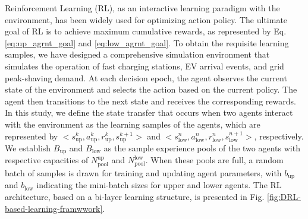 \documentclass[preprint,12pt]{elsarticle}
\begin{document}
Reinforcement Learning (RL), as an interactive learning paradigm with the environment, has been widely used for optimizing action policy. The ultimate goal of RL is to achieve maximum cumulative rewards, as represented by Eq. \ref{eq:up_agrnt_goal} and \ref{eq:low_agrnt_goal}. To obtain the requisite learning samples, we have designed a comprehensive simulation environment that simulates the operation of fast charging stations, EV arrival events, and grid peak-shaving demand. At each decision epoch, the agent observes the current state of the environment and selects the action based on the current policy. The agent then transitions to the next state and receives the corresponding rewards. In this study, we define the state transfer that occurs when two agents interact with the environment as the learning samples of the agents,
which are represented by $<s_{\textrm{up}}^{k},a_{\textrm{up}}^{k},r_{\textrm{up}}^{k},s_{\textrm{up}}^{k+1}>$ and $<s_{\textrm{low}}^{n},a_{\textrm{low}}^{n},r_{\textrm{low}}^{n},s_{\textrm{low}}^{n+1}>$,
respectively. We establish $B_{\textrm{up}}$ and $B_{\textrm{low}}$ as the sample experience pools of the two agents with respective capacities of $N_{\textrm{pool}}^{\textrm{up}}$ and $N_{\textrm{pool}}^{\textrm{low}}$. When these pools are full, a random batch of samples is drawn for training and updating agent parameters, with $b_{\text{up}}$ and $b_{\text{low}}$ indicating the mini-batch sizes for upper and lower agents. The RL architecture, based on a bi-layer learning structure, is presented in Fig. \ref{fig:DRL-based-learning-framwwork}.
\end{document}
